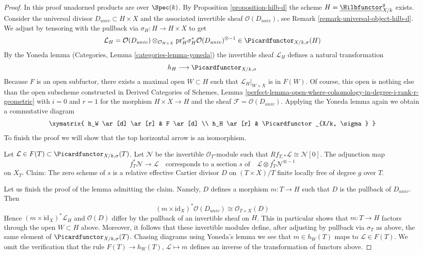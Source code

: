 \begin{proof}
In this proof unadorned products are over $\Spec(k)$.
By Proposition \ref{proposition-hilb-d} the scheme
$H = \underline{\Hilbfunctor}^g_{X/k}$ exists.
Consider the universal divisor $D_{univ} \subset H \times X$
and the associated invertible sheaf $\mathcal{O}(D_{univ})$, see
Remark \ref{remark-universal-object-hilb-d}.
We adjust by tensoring with the pullback via
$\sigma_H : H \to H \times X$ to get
$$
\mathcal{L}_H =
\mathcal{O}(D_{univ})
\otimes_{\mathcal{O}_{H \times X}}
\text{pr}_H^*\sigma_H^*\mathcal{O}(D_{univ})^{\otimes -1}
\in
\Picardfunctor_{X/k, \sigma}(H)
$$
By the Yoneda lemma (Categories, Lemma \ref{categories-lemma-yoneda})
the invertible sheaf $\mathcal{L}_H$ defines a natural transformation
$$
h_H \longrightarrow \Picardfunctor_{X/k, \sigma}
$$
Because $F$ is an open subfuctor, there exists a maximal open
$W \subset H$ such that $\mathcal{L}_H|_{W \times X}$ is in
$F(W)$. Of course, this open is nothing else than the
open subscheme constructed in
Derived Categories of Schemes, Lemma
\ref{perfect-lemma-open-where-cohomology-in-degree-i-rank-r-geometric}
with $i = 0$ and $r = 1$ for the morphism $H \times X \to H$ and the sheaf
$\mathcal{F} = \mathcal{O}(D_{univ})$. Applying the Yoneda lemma
again we obtain a commutative diagram
$$
\xymatrix{
h_W \ar[d] \ar[r] & F \ar[d] \\
h_H \ar[r] & \Picardfunctor_{X/k, \sigma}
}
$$
To finish the proof we will show that the top horizontal arrow is an
isomorphism.

\medskip\noindent
Let $\mathcal{L} \in F(T) \subset \Picardfunctor_{X/k, \sigma}(T)$.
Let $\mathcal{N}$ be the invertible $\mathcal{O}_T$-module
such that $Rf_{T, *}\mathcal{L} \cong \mathcal{N}[0]$.
The adjunction map
$$
f_T^*\mathcal{N} \longrightarrow \mathcal{L}
\quad\text{corresponds to a section }s\text{ of}\quad
\mathcal{L} \otimes f_T^*\mathcal{N}^{\otimes -1}
$$
on $X_T$. Claim: The zero scheme of $s$ is a relative effective Cartier
divisor $D$ on $(T \times X)/T$ finite locally free of degree $g$ over $T$.

\medskip\noindent
Let us finish the proof of the lemma admitting the claim.
Namely, $D$ defines a morphism $m : T \to H$ such that $D$ is the pullback of
$D_{univ}$. Then
$$
(m \times \text{id}_X)^*\mathcal{O}(D_{univ}) \cong
\mathcal{O}_{T \times X}(D)
$$
Hence $(m \times \text{id}_X)^*\mathcal{L}_H$ and $\mathcal{O}(D)$
differ by the pullback of an invertible sheaf on $H$. This in particular
shows that $m : T \to H$ factors through the open $W \subset H$ above.
Moreover, it follows that these invertible modules define, after adjusting
by pullback via $\sigma_T$ as above, the same element of
$\Picardfunctor_{X/k, \sigma}(T)$. Chasing diagrams using Yoneda's lemma
we see that $m \in h_W(T)$ maps to $\mathcal{L} \in F(T)$. We omit
the verification that the rule $F(T) \to h_W(T)$,
$\mathcal{L} \mapsto m$ defines an inverse of the transformation
of functors above.


\end{proof}

